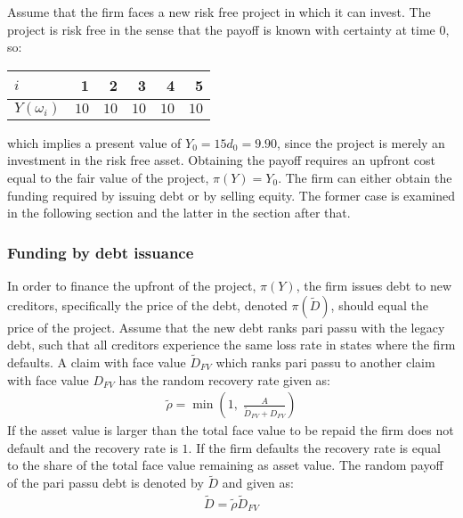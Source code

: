 \documentclass[../main.tex]{subfiles}
\begin{document}
        Assume that the firm faces a new risk free project in which it can invest.
        The project is risk free in the sense that the payoff is known with certainty at time 0, so:
            \begin{table}[H]
                \centering
                \begin{tabular}{l|rrrrr}
                    $i$ & 1 & 2 & 3 & 4 & 5 \\
                    \hline
                    $Y(\omega_{i})$ & $10$ & $10$ & $10$ & $10$ & $10$
                \end{tabular}
            \end{table}
        which implies a present value of $Y_{0} = 15d_{0} = 9.90$, since the project is merely an investment in the risk free asset.
        Obtaining the payoff requires an upfront cost equal to the fair value of the project, $\pi(Y) = Y_{0}$.
        The firm can either obtain the funding required by issuing debt or by selling equity.
        The former case is examined in the following section and the latter in the section after that.

    \subsubsection{Funding by debt issuance}
        In order to finance the upfront of the project, $\pi(Y)$, the firm issues debt to new creditors, specifically the price of the debt, denoted $\pi(\tilde{D})$, should equal the price of the project.
        Assume that the new debt ranks pari passu with the legacy debt, such that all creditors experience the same loss rate in states where the firm defaults.
        A claim with face value $\tilde{D}_{FV}$ which ranks pari passu to another claim with face value $D_{FV}$ has the random recovery rate given as:
            \begin{align}
                \tilde{\rho} = \min\left(
                    1,\;
                    \frac{A}{\tilde{D}_{FV} + D_{FV}}
                \right)
            \end{align}
        If the asset value is larger than the total face value to be repaid the firm does not default and the recovery rate is $1$.
        If the firm defaults the recovery rate is equal to the share of the total face value remaining as asset value.
        The random payoff of the pari passu debt is denoted by $\tilde{D}$ and given as:
            \begin{align}
                \tilde{D}
                    = \tilde{\rho}\tilde{D}_{FV}
            \end{align}
\end{document}
